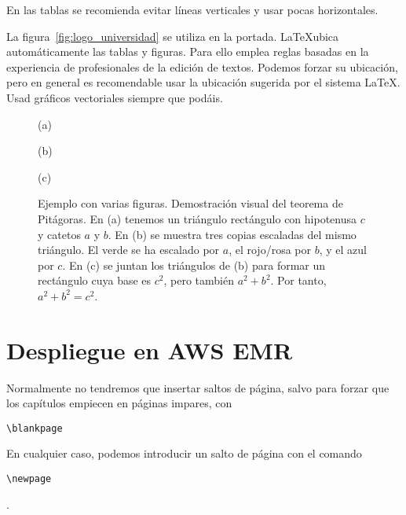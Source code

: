 \documentclass[12pt,twoside,titlepage]{report}
\newcommand\blankpage{%
    \newpage
    \null
    \thispagestyle{empty}%
    \newpage}
\begin{document}
En las tablas se recomienda evitar líneas verticales y usar pocas horizontales. 

La figura~\ref{fig:logo_universidad} se utiliza en la portada. \LaTeX ubica automáticamente las tablas y figuras. Para ello emplea reglas basadas en la experiencia de profesionales de la edición de textos. Podemos forzar su ubicación, pero en general es recomendable usar la ubicación sugerida por el sistema \LaTeX. Usad gráficos vectoriales siempre que podáis.





\begin{figure}
   \centering

  \begin{minipage}{0.45\textwidth}
   \centering


    \footnotesize (a)
  \end{minipage}
  \hfill
  \begin{minipage}{0.45\textwidth}
   \centering

   \footnotesize (b)
  \end{minipage}

    \bigskip

    \footnotesize (c)

  \caption{Ejemplo con varias figuras. Demostración visual del teorema de Pitágoras. En (a) tenemos un triángulo rectángulo con hipotenusa $c$ y catetos $a$ y $b$. En (b) se muestra tres copias escaladas del mismo triángulo. El verde se ha escalado por $a$, el rojo/rosa por $b$, y el azul por $c$. En (c) se juntan los triángulos de (b) para formar un rectángulo cuya base es $c^{2}$, pero también $a^{2} + b^{2}$. Por tanto, $a^{2} + b^{2} = c^{2}$.}\label{fig:teoremapitagoras}
\end{figure}





\section{Despliegue en AWS EMR}

Normalmente no tendremos que insertar saltos de página, salvo para forzar que los capítulos empiecen en páginas impares, con \begin{verbatim}\blankpage\end{verbatim} En cualquier caso, podemos introducir un salto de página con el comando \begin{verbatim}\newpage\end{verbatim}.
\end{document}

